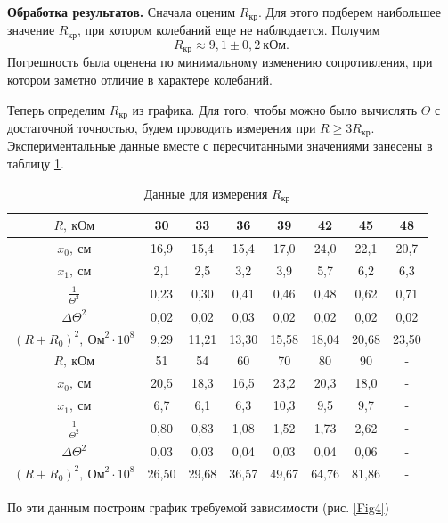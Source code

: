 \documentclass[12pt,a4paper]{article}
\begin{document}
\textbf{Обработка результатов.} Сначала оценим $R_\text{кр}$. Для этого подберем наибольшее значение $R_\text{кр}$, при котором колебаний еще не наблюдается. Получим
\begin{equation}
R_\text{кр} \approx 9,1 \pm 0,2~\text{кОм}.
\end{equation}
Погрешность была оценена по минимальному изменению сопротивления, при котором заметно отличие в характере колебаний.

Теперь определим $R_\text{кр}$ из графика. Для того, чтобы можно было вычислять $\Theta$ с достаточной точностью, будем проводить измерения при $R \geq 3R_\text{кр}$. Экспериментальные данные вместе с пересчитанными значениями занесены в таблицу \ref{tab2}.
\begin{table}[ht]\centering
\begin{tabular}{|*{8}{c|}}
\hline
$R,~\text{кОм}$&30&33&36&39&42&45&48\\
\hline
$x_0,~\text{см}$&16,9&15,4&15,4&17,0&24,0&22,1&20,7\\
\hline
$x_1,~\text{см}$&2,1&2,5&3,2&3,9&5,7&6,2&6,3\\
\hline
$\frac{1}{\Theta^2}$&0,23&0,30&0,41&0,46&0,48&0,62&0,71\\
\hline
$\Delta\Theta^2$&0,02&0,02&0,03&0,02&0,02&0,02&0,02\\
\hline
$\left(R+R_0\right)^2,~\text{Ом}^2\cdot10^8$&9,29&11,21&13,30&15,58&18,04&20,68&23,50\\
\hline
$R,~\text{кОм}$&51&54&60&70&80&90&-\\
\hline
$x_0,~\text{см}$&20,5&18,3&16,5&23,2&20,3&18,0&-\\
\hline
$x_1,~\text{см}$&6,7&6,1&6,3&10,3&9,5&9,7&-\\
\hline
$\frac{1}{\Theta^2}$&0,80&0,83&1,08&1,52&1,73&2,62&-\\
\hline
$\Delta\Theta^2$&0,03&0,03&0,04&0,03&0,04&0,06&-\\
\hline
$\left(R+R_0\right)^2,~\text{Ом}^2\cdot10^8$&26,50&29,68&36,57&49,67&64,76&81,86&-\\
\hline
\end{tabular}
\caption{Данные для измерения $R_\text{кр}$ \label{tab2}}
\end{table}
По эти данным построим график требуемой зависимости (рис. \ref{Fig4})
\medskip
\end{document}
